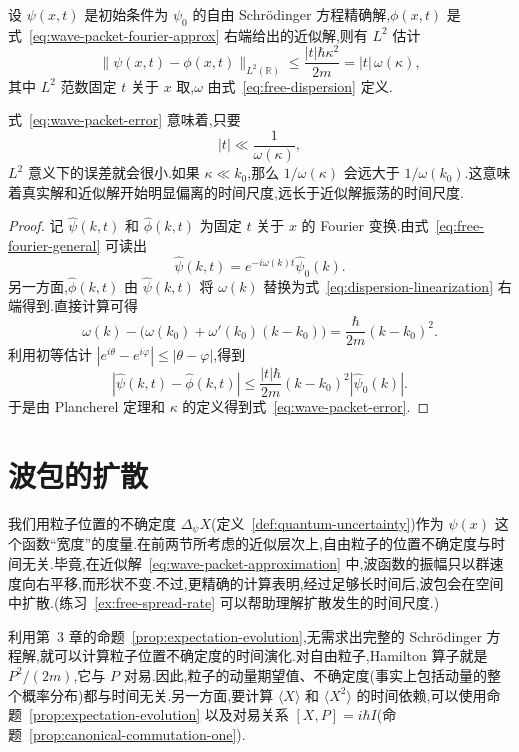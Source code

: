 \begin{proposition}[波包近似的误差估计]\label{prop:wave-packet-error}
设 \(\psi(x,t)\) 是初始条件为 \(\psi_{0}\) 的自由 Schrödinger 方程精确解,\(\phi(x,t)\) 是式~\eqref{eq:wave-packet-fourier-approx} 右端给出的近似解,则有 \(L^{2}\) 估计
\begin{equation}
\|\psi(x,t)-\phi(x,t)\|_{L^{2}(\mathbb{R})}
\le\frac{|t|\hbar\kappa^{2}}{2m}
=|t|\,\omega(\kappa),
\label{eq:wave-packet-error}
\end{equation}
其中 \(L^{2}\) 范数固定 \(t\) 关于 \(x\) 取,\(\omega\) 由式~\eqref{eq:free-dispersion} 定义.
\end{proposition}

式~\eqref{eq:wave-packet-error} 意味着,只要
\[
|t|\ll\frac{1}{\omega(\kappa)},
\]
\(L^{2}\) 意义下的误差就会很小.如果 \(\kappa\ll k_{0}\),那么 \(1/\omega(\kappa)\) 会远大于 \(1/\omega(k_{0})\).这意味着真实解和近似解开始明显偏离的时间尺度,远长于近似解振荡的时间尺度.

\begin{proof}
记 \(\widehat{\psi}(k,t)\) 和 \(\widehat{\phi}(k,t)\) 为固定 \(t\) 关于 \(x\) 的 Fourier 变换.由式~\eqref{eq:free-fourier-general} 可读出
\[
\widehat{\psi}(k,t)=e^{-i\omega(k)t}\widehat{\psi}_{0}(k).
\]
另一方面,\(\widehat{\phi}(k,t)\) 由 \(\widehat{\psi}(k,t)\) 将 \(\omega(k)\) 替换为式~\eqref{eq:dispersion-linearization} 右端得到.直接计算可得
\[
\omega(k)-\bigl(\omega(k_{0})+\omega'(k_{0})(k-k_{0})\bigr)
=\frac{\hbar}{2m}(k-k_{0})^{2}.
\]
利用初等估计 \(|e^{i\theta}-e^{i\varphi}|\le|\theta-\varphi|\),得到
\[
|\widehat{\psi}(k,t)-\widehat{\phi}(k,t)|
\le\frac{|t|\hbar}{2m}(k-k_{0})^{2}|\widehat{\psi}_{0}(k)|.
\]
于是由 Plancherel 定理和 \(\kappa\) 的定义得到式~\eqref{eq:wave-packet-error}.
\end{proof}

\section{波包的扩散}\label{sec:wave-packet-spread}

我们用粒子位置的不确定度 \(\Delta_{\psi}X\)(定义~\ref{def:quantum-uncertainty})作为 \(\psi(x)\) 这个函数“宽度”的度量.在前两节所考虑的近似层次上,自由粒子的位置不确定度与时间无关.毕竟,在近似解~\eqref{eq:wave-packet-approximation} 中,波函数的振幅只以群速度向右平移,而形状不变.不过,更精确的计算表明,经过足够长时间后,波包会在空间中扩散.(练习~\ref{ex:free-spread-rate} 可以帮助理解扩散发生的时间尺度.)

利用第~3 章的命题~\ref{prop:expectation-evolution},无需求出完整的 Schrödinger 方程解,就可以计算粒子位置不确定度的时间演化.对自由粒子,Hamilton 算子就是 \(P^{2}/(2m)\),它与 \(P\) 对易.因此,粒子的动量期望值、不确定度(事实上包括动量的整个概率分布)都与时间无关.另一方面,要计算 \(\langle X\rangle\) 和 \(\langle X^{2}\rangle\) 的时间依赖,可以使用命题~\ref{prop:expectation-evolution} 以及对易关系 \([X,P]=i\hbar I\)(命题~\ref{prop:canonical-commutation-one}).

